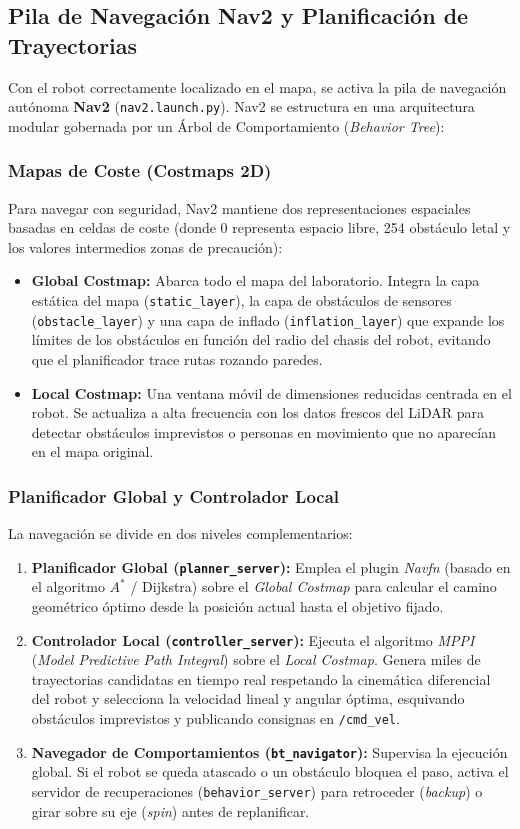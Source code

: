 \documentclass[11pt,a4paper]{article}
\begin{document}
\subsection{Pila de Navegación Nav2 y Planificación de Trayectorias}

Con el robot correctamente localizado en el mapa, se activa la pila de navegación autónoma \textbf{Nav2} (\texttt{nav2.launch.py}). Nav2 se estructura en una arquitectura modular gobernada por un Árbol de Comportamiento (\textit{Behavior Tree}):

\subsubsection{Mapas de Coste (Costmaps 2D)}
Para navegar con seguridad, Nav2 mantiene dos representaciones espaciales basadas en celdas de coste (donde 0 representa espacio libre, 254 obstáculo letal y los valores intermedios zonas de precaución):
\begin{itemize}
    \item \textbf{Global Costmap:} Abarca todo el mapa del laboratorio. Integra la capa estática del mapa (\texttt{static\_layer}), la capa de obstáculos de sensores (\texttt{obstacle\_layer}) y una capa de inflado (\texttt{inflation\_layer}) que expande los límites de los obstáculos en función del radio del chasis del robot, evitando que el planificador trace rutas rozando paredes.
    \item \textbf{Local Costmap:} Una ventana móvil de dimensiones reducidas centrada en el robot. Se actualiza a alta frecuencia con los datos frescos del LiDAR para detectar obstáculos imprevistos o personas en movimiento que no aparecían en el mapa original.
\end{itemize}

\subsubsection{Planificador Global y Controlador Local}
La navegación se divide en dos niveles complementarios:
\begin{enumerate}
    \item \textbf{Planificador Global (\texttt{planner\_server}):} Emplea el plugin \textit{Navfn} (basado en el algoritmo $A^*$ / Dijkstra) sobre el \textit{Global Costmap} para calcular el camino geométrico óptimo desde la posición actual hasta el objetivo fijado.
    \item \textbf{Controlador Local (\texttt{controller\_server}):} Ejecuta el algoritmo \textit{MPPI} (\textit{Model Predictive Path Integral}) sobre el \textit{Local Costmap}. Genera miles de trayectorias candidatas en tiempo real respetando la cinemática diferencial del robot y selecciona la velocidad lineal y angular óptima, esquivando obstáculos imprevistos y publicando consignas en \texttt{/cmd\_vel}.
    \item \textbf{Navegador de Comportamientos (\texttt{bt\_navigator}):} Supervisa la ejecución global. Si el robot se queda atascado o un obstáculo bloquea el paso, activa el servidor de recuperaciones (\texttt{behavior\_server}) para retroceder (\textit{backup}) o girar sobre su eje (\textit{spin}) antes de replanificar.
\end{enumerate}
\end{document}
